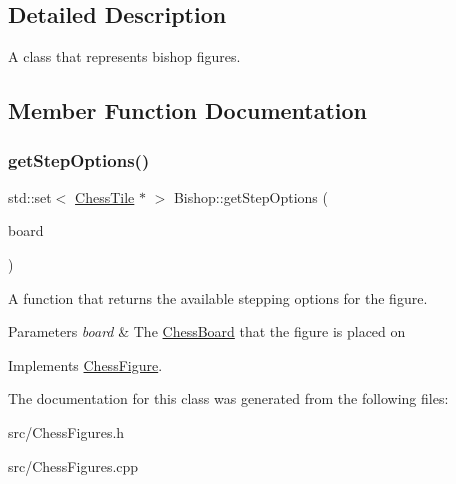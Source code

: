 \subsection{Detailed Description}
A class that represents bishop figures. 

\subsection{Member Function Documentation}
\mbox{\label{classBishop_a5da898db86a3025a5064d2d6ea2f1148}} 
\subsubsection{\texorpdfstring{get\+Step\+Options()}{getStepOptions()}}
{\footnotesize\ttfamily std\+::set$<$ \mbox{\hyperlink{classChessTile}{Chess\+Tile}} $\ast$ $>$ Bishop\+::get\+Step\+Options (\begin{DoxyParamCaption}\item[{\mbox{\hyperlink{classChessBoard}{Chess\+Board}} \&}]{board }\end{DoxyParamCaption})\hspace{0.3cm}{\ttfamily [virtual]}}



A function that returns the available stepping options for the figure. 


\begin{DoxyParams}{Parameters}
{\em board} & The \mbox{\hyperlink{classChessBoard}{Chess\+Board}} that the figure is placed on \\
\hline
\end{DoxyParams}


Implements \mbox{\hyperlink{classChessFigure_ae78d52e35c4ea926f492d211c69758bd}{Chess\+Figure}}.



The documentation for this class was generated from the following files\+:\begin{DoxyCompactItemize}
\item 
src/Chess\+Figures.\+h\item 
src/Chess\+Figures.\+cpp\end{DoxyCompactItemize}
